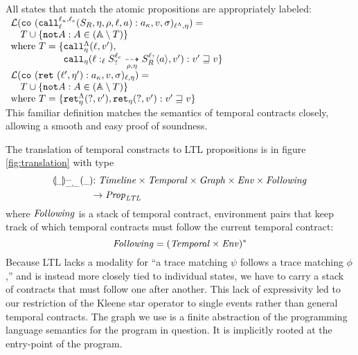 \documentclass[preprint,onecolumn,9pt]{sigplanconf} %
\begin{document}
All states that match the atomic propositions are appropriately labeled: \\
$
\begin{array}{l}
 \labelof(\co{\spush{\kmcall{\mmlab_u}{\mmlab_c}{\mlab}{\mscon_R, \mtimeline, \menv, \mtoplevelname, \maddr}}{\mkaddr}, \mval, \msto}{\msmlab}{\mstimeline})
  =\\
 \quad \mtcon \cup \setbuild{\apneg{\mevent}}{\mevent \in (\ltlactions \setminus \mtcon)}
 \\ \text{where } \mtcon = \setbuild{\aptopcall{\mtoplevelname}{\mval'}{\mtimeline},\\
                                     \phantom{\text{where } \mtcon = \{}\apvcall{\blclos{\mtoplevelname}{\mmlab_?}{\mmlab_c}{\mlab}{\mscon_?}{\mscon_R}{\menv}{\mtimeline}{\maddr}}{\mval'}{\mtimeline}}
                                       {\mval' \sqsupseteq \mval}
\\
 \labelof(\co{\spush{\krt{\mmlab',\mtimeline'}}{\mkaddr}, \mval, \msto}{\mtoplevelname}{\mstimeline}) =\\
 \quad \mtcon \cup \setbuild{\apneg{\mevent}}{\mevent \in (\ltlactions \setminus \mtcon)}
 \\ \text{where } \mtcon = \setbuild{\aptopret{?}{\mval'}{\mstimeline},
                                        \apvret{?}{\mval'}{\mstimeline}}
                                       {\mval' \sqsupseteq \mval}
\end{array}$
\\
This familiar definition matches the semantics of temporal contracts closely, allowing a smooth and easy proof of soundness.

The translation of temporal constracts to LTL propositions is in figure \autoref{fig:translation} with type
\begin{align*}
{\scriptsize \toltl{\_}{\_}{\_}{\_}{\_}} &{\scriptsize : \Timeline \times \TContract \times \Graph \times \Env \times \TConEnvStack}\\ & {\scriptsize \to \LTLProp}
\end{align*}
%
where $\mathit{Following}$ is a stack of temporal contract, environment pairs that keep track of which temporal contracts must follow the current temporal contract:
%
\begin{equation*}
  \mathit{Following} = (\mathit{Temporal} \times \mathit{Env})^*
\end{equation*}
%
Because LTL lacks a modality for ``a trace matching $\psi$ follows a trace matching $\phi$,'' and is instead more closely tied to individual states, we have to carry a stack of contracts that must follow one after another.
%
This lack of expressivity led to our restriction of the Kleene star operator to single events rather than general temporal contracts.
%
The graph we use is a finite abstraction of the programming language semantics for the program in question.
%
It is implicitly rooted at the entry-point of the program.
\end{document}
